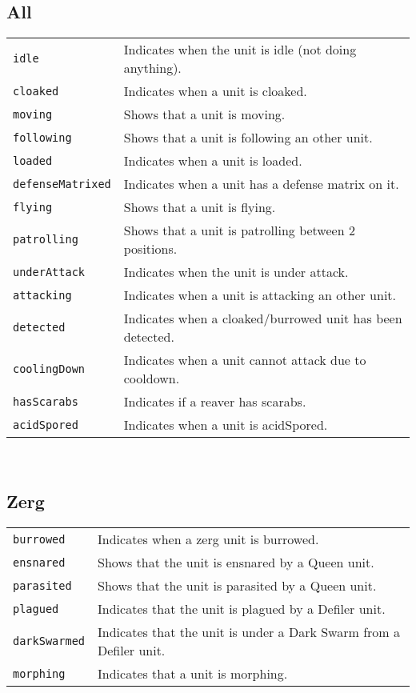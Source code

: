 \subsection{All}
\begin{tabularx}{\textwidth}{lX}
 \verb|idle| & Indicates when the unit is idle (not doing anything).\\
 \verb|cloaked| & Indicates when a unit is cloaked.\\
 \verb|moving| & Shows that a unit is moving.\\
 \verb|following| & Shows that a unit is following an other unit.\\
 \verb|loaded| & Indicates when a unit is loaded.\\
 \verb|defenseMatrixed| & Indicates when a unit has a defense matrix on it.\\
 \verb|flying| & Shows that a unit is flying.\\
 \verb|patrolling| & Shows that a unit is patrolling between 2 positions.\\
 \verb|underAttack| & Indicates when the unit is under attack.\\
 \verb|attacking | & Indicates when a unit is attacking an other unit.\\
 \verb|detected | & Indicates when a cloaked/burrowed unit has been detected.\\
 \verb|coolingDown | & Indicates when a unit cannot attack due to cooldown.\\
 \verb|hasScarabs | & Indicates if a reaver has scarabs.\\
 \verb|acidSpored | & Indicates when a unit is acidSpored.\\
\end{tabularx} \\

\subsection{Zerg}
\begin{tabularx}{\textwidth}{lX}
\verb|burrowed| & Indicates when a zerg unit is burrowed. \\
\verb|ensnared| & Shows that the unit is ensnared by a Queen unit. \\
\verb|parasited| & Shows that the unit is parasited by a Queen unit. \\
\verb|plagued| & Indicates that the unit is plagued by a Defiler unit. \\
\verb|darkSwarmed| & Indicates that the unit is under a Dark Swarm from a Defiler unit. \\
\verb|morphing| & Indicates that a unit is morphing. \\
\end{tabularx} \\

